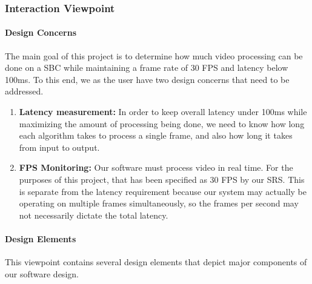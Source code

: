 \subsubsection{Interaction Viewpoint}
	\paragraph{Design Concerns}
	The main goal of this project is to determine how much video processing can be done on a SBC while maintaining a frame rate of 30 FPS and latency below 100ms. To this end, we as the user have two design concerns that need to be addressed.\\
	
	\begin{enumerate}[leftmargin=2cm,labelindent=2cm]
	\item \textbf{Latency measurement:}
	In order to keep overall latency under 100ms while maximizing the amount of processing being done, we need to know how long each algorithm 	takes to process a single frame, and also how long it takes from input to output.

	\item \textbf{FPS Monitoring:}
	Our software must process video in real time. For the purposes of this project, that has been specified as 30 FPS by our SRS. This is separate 	from the latency requirement because our system may actually be operating on multiple frames simultaneously, so the frames per second may not 	necessarily dictate the total latency.\\
	\end{enumerate}
	
	\paragraph{Design Elements}
	This viewpoint contains several design elements that depict major components of our software design.\\
	
